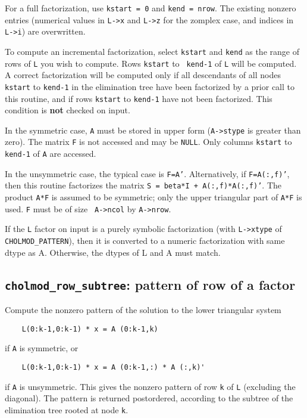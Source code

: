 \documentclass[11pt]{article}
\begin{document}
For a full factorization, use {\tt kstart = 0} and {\tt kend = nrow}.  The
existing nonzero entries (numerical values in {\tt L->x} and {\tt L->z} for the
zomplex case, and indices in {\tt L->i}) are overwritten.

To compute an incremental factorization, select {\tt kstart} and {\tt kend} as
the range of rows of {\tt L} you wish to compute.    Rows {\tt kstart} to {\tt
kend-1} of {\tt L} will be computed.  A correct factorization will be computed
only if all descendants of all nodes {\tt kstart} to {\tt kend-1} in the
elimination tree have been factorized by a prior call to this routine, and if
rows {\tt kstart} to {\tt kend-1} have not been factorized.  This condition is
{\bf not} checked on input.

In the symmetric case, {\tt A} must be stored in upper form ({\tt A->stype} is
greater than zero).  The matrix {\tt F} is not accessed and may be {\tt NULL}.
Only columns {\tt kstart} to {\tt kend-1} of {\tt A} are accessed.

In the unsymmetric case, the typical case is {\tt F=A'}.  Alternatively, if
{\tt F=A(:,f)'}, then this routine factorizes the matrix {\tt S = beta*I +
A(:,f)*A(:,f)'}.  The product {\tt A*F} is assumed to be symmetric; only the
upper triangular part of {\tt A*F} is used.  {\tt F} must be of size {\tt
A->ncol} by {\tt A->nrow}.

If the \verb'L' factor on input is a purely symbolic factorization (with
\verb'L->xtype' of \verb'CHOLMOD_PATTERN'), then it is converted to a numeric
factorization with same dtype as A.  Otherwise, the dtypes of L and A must
match.


\subsection{{\tt cholmod\_row\_subtree}: pattern of row of a factor}


Compute the nonzero pattern of the solution to the lower triangular system
\begin{verbatim}
    L(0:k-1,0:k-1) * x = A (0:k-1,k)
\end{verbatim}
if {\tt A} is symmetric, or
\begin{verbatim}
    L(0:k-1,0:k-1) * x = A (0:k-1,:) * A (:,k)'
\end{verbatim}
if {\tt A} is unsymmetric.  This gives the nonzero pattern of row {\tt k} of
{\tt L} (excluding the diagonal).  The pattern is returned postordered,
according to the subtree of the elimination tree rooted at node {\tt k}.
\end{document}
